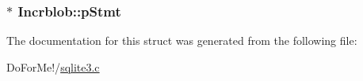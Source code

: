 \hypertarget{struct_incrblob_a8b7b39c9372db552add74c69f14a61a3}{
\subsubsection[{p\-Stmt}]{$\ast$ Incrblob\-::p\-Stmt}}\label{struct_incrblob_a8b7b39c9372db552add74c69f14a61a3}


The documentation for this struct was generated from the following file\-:\begin{DoxyCompactItemize}
\item 
Do\-For\-Me!/\hyperlink{sqlite3_8c}{sqlite3.\-c}\end{DoxyCompactItemize}
